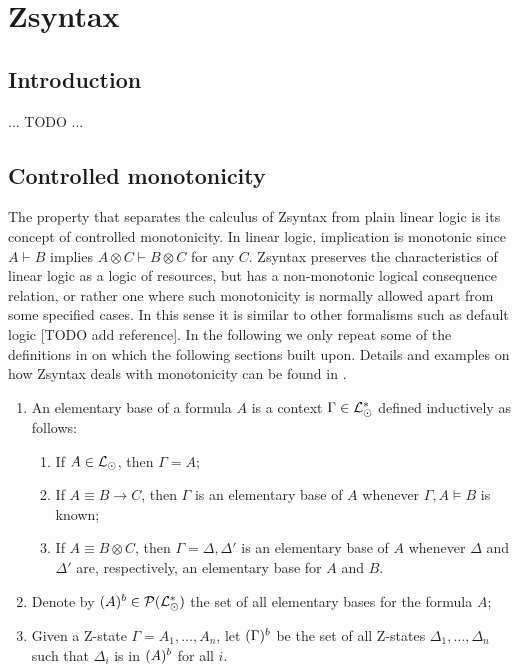 \section{Zsyntax}

\subsection{Introduction}

... TODO ...

\subsection{Controlled monotonicity}

The property that separates the calculus of Zsyntax from plain linear logic is
its concept of controlled monotonicity. In linear logic, implication is
monotonic since $A \vdash B$ implies $A \otimes C \vdash B \otimes C$ for any
$C$. Zsyntax preserves the characteristics of linear logic as a logic of
resources, but has a non-monotonic logical consequence relation, or rather one
where such monotonicity is normally allowed apart from some specified cases. In
this sense it is similar to other formalisms such as default logic [TODO add
reference]. In the following we only repeat some of the definitions in
\cite{adding-logic} on which the following sections built upon. Details and
examples on how Zsyntax deals with monotonicity can be found in
\cite{adding-logic}.

\begin{definition}
  \begin{enumerate}
  \item An elementary base of a formula $A$ is a context
    $\Gamma \in \mathcal{L}_{\odot}^*$ defined inductively as follows:

    \begin{enumerate}
    \item If $A \in \mathcal{L}_{\odot}$, then $\Gamma = A$;
    \item If $A \equiv B \rightarrow C$, then $\Gamma$ is an elementary base of
      $A$ whenever $\Gamma, A \models B$ is known;
    \item If $A \equiv B \otimes C$, then $\Gamma = \Delta, \Delta'$ is an
      elementary base of $A$ whenever $\Delta$ and $\Delta'$ are, respectively,
      an elementary base for $A$ and $B$.
    \end{enumerate}

  \item Denote by $(A)^{b} \in \mathcal{P}(\mathcal{L}_{\odot}^*)$ the set of all
    elementary bases for the formula $A$;
  \item Given a Z-state $\Gamma = A_1, \dots, A_n$, let $(\Gamma)^{b}$ be
    the set of all Z-states $\Delta_1, \dots, \Delta_n$ such that $\Delta_i$ is
    in $(A)^{b}$ for all $i$.
  \end{enumerate}
\end{definition}

